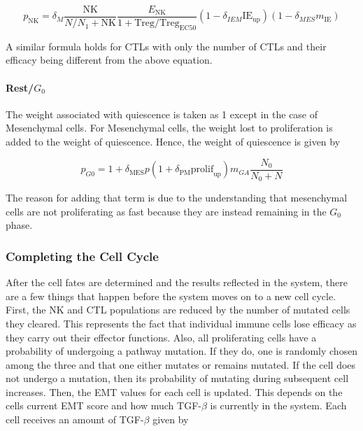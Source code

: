 \documentclass{article}
\begin{document}
$$ p_{\text{NK}} =\delta_M \frac{\text{NK}}{N/N_{1}+\text{NK}}  \frac{E_{\text{NK}}}{1+\text{Treg}/\text{Treg}_{\text{EC50}}} (1-\delta_{IEM}\text{IE}_{\text{up}})(1-\delta_{MES}m_{\text{IE}}) $$

A similar formula holds for CTLs with only the number of CTLs and their efficacy being different from the above equation.


\paragraph{Rest/$G_0$} %
The weight associated with quiescence is taken as 1 except in the case of Mesenchymal cells.
For Mesenchymal cells, the weight lost to proliferation is added to the weight of quiescence.
Hence, the weight of quiescence is given by

$$ p_{G0} = 1 + \delta_{\text{MES}}p(1+\delta_{\text{PM}}\text{prolif}_{\text{up}})m_{GA}\frac{N_0}{N_0+N} $$ 

The reason for adding that term is due to the understanding that mesenchymal cells are not proliferating as fast because they are instead remaining in the $G_0$ phase. %

\subsubsection{Completing the Cell Cycle}
After the cell fates are determined and the results reflected in the system, there are a few things that happen before the system moves on to a new cell cycle.
First, the NK and CTL populations are reduced by the number of mutated cells they cleared.
This represents the fact that individual immune cells lose efficacy as they carry out their effector functions. 
%
Also, all proliferating cells have a probability of undergoing a pathway mutation.
If they do, one is randomly chosen among the three and that one either mutates or remains mutated.
If the cell does not undergo a mutation, then its probability of mutating during subsequent cell increases. 
%
Then, the EMT values for each cell is updated.
This depends on the cells current EMT score and how much TGF-$\beta$ is currently in the system.
Each cell receives an amount of TGF-$\beta$ given by
\end{document}
